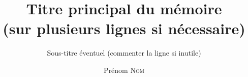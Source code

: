 \documentclass{univ-thesis}
\title{Titre principal du mémoire \\ (sur plusieurs lignes si nécessaire)}
\subtitle{Sous-titre éventuel (commenter la ligne si inutile)}
\author{Prénom \textsc{Nom}}
\begin{document}
\maketitle

% 
% 

\tableofcontents
\newpage

% 
% 
% 
% 
% 

% 
% 

\backcoverpage
\end{document}
